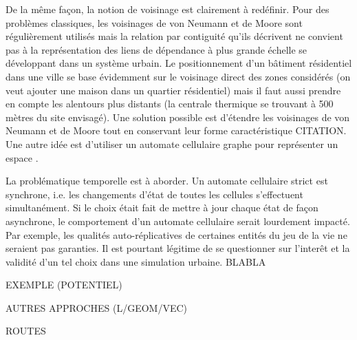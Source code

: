 \documentclass[10pt]{article}
\begin{document}
\begin{multicols}{2}
De la même façon, la notion de voisinage est clairement à
redéfinir. Pour des problèmes classiques, les voisinages de von
Neumann et de Moore sont régulièrement utilisés mais la relation par
contiguité qu'ils décrivent ne convient pas à la représentation des
liens de dépendance à plus grande échelle se développant dans un
système urbain. Le positionnement d'un bâtiment résidentiel dans une
ville se base évidemment sur le voisinage direct des zones considérés
(on veut ajouter une maison dans un quartier résidentiel) mais il faut
aussi prendre en compte les alentours plus distants (la centrale
thermique se trouvant à 500 mètres du site envisagé). Une solution
possible est d'étendre les voisinages de von Neumann et de Moore tout
en conservant leur forme caractéristique CITATION. Une autre idée est
d'utiliser un automate cellulaire graphe pour représenter un
espace \cite{0'Sullivan2001}.

La problématique temporelle est à aborder. Un automate cellulaire
strict est synchrone, i.e. les changements d'état de toutes les
cellules s'effectuent simultanément. Si le choix était fait de mettre
à jour chaque état de façon asynchrone, le comportement d'un automate
cellulaire serait lourdement impacté. Par exemple, les qualités
auto-réplicatives de certaines entités du jeu de la vie ne seraient
pas garanties. Il est pourtant légitime de se questionner sur
l'interêt et la validité d'un tel choix dans une simulation
urbaine. BLABLA

EXEMPLE (POTENTIEL)

AUTRES APPROCHES (L/GEOM/VEC)

ROUTES

\end{multicols}
\end{document}
